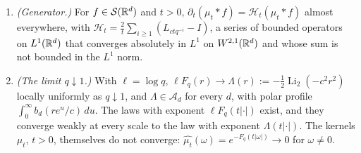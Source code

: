 \begin{theorem}
\begin{enumerate}
Theorem~\ref{thm:matern-pyramid-line}. For $f \in L^1(\RR^d)$ and $t > 0$ call $\mu_t * f$ the
\emph{record} of $f$ at scale $t$. Its projection along $e$, the density of the image of
$(\mu_t * f)(x)\,dx$ under $x \mapsto \langle e, x\rangle$, is the \emph{projected record}. It is
the projection of $f$ convolved with a \Polya{} frequency density. Suppose that the projection of
$f$ has a version that is the primitive of an integrable function. Then for every $t > 0$ the
projected record at scale $t$ crosses each level no more often, and changes monotonicity no more
often, than that version. Under the same hypothesis, for every $s > 0$ the projected record at
scale $qs$ crosses each level no more often, and changes monotonicity no more often, than the
projected record at scale $s$.
\item \emph{(Generator.)} For $f \in \mathcal{S}(\mathbb{R}^d)$ and $t > 0$,
$\partial_t(\mu_t * f) = \mathcal{H}_t(\mu_t * f)$ almost everywhere, with
$\mathcal{H}_t = \frac2t\sum_{i \ge 1}(L_{ctq^{-i}} - I)$, a series of bounded operators on
$L^1(\mathbb{R}^d)$ that converges absolutely in $L^1$ on $W^{2,1}(\mathbb{R}^d)$ and whose sum is not bounded in
the $L^1$ norm.
\item \emph{(The limit $q \downarrow 1$.)} With $\ell = \log q$, $\ell F_q(r) \to \Lambda(r) :=
-\tfrac12\operatorname{Li}_2(-c^2r^2)$ locally uniformly as $q \downarrow 1$, and
$\Lambda \in \mathcal{A}_d$ for every $d$, with polar profile $\int_0^\infty b_d(re^u/c)\,du$. The
laws with exponent $\ell F_q(t|\cdot|)$ exist, and they converge weakly at every scale to the law
with exponent $\Lambda(t|\cdot|)$. The kernels $\mu_t$, $t > 0$, themselves do not converge:
$\widehat{\mu_t}(\omega) = e^{-F_q(t|\omega|)} \to 0$ for $\omega \ne 0$.
\end{enumerate}

\end{theorem}
